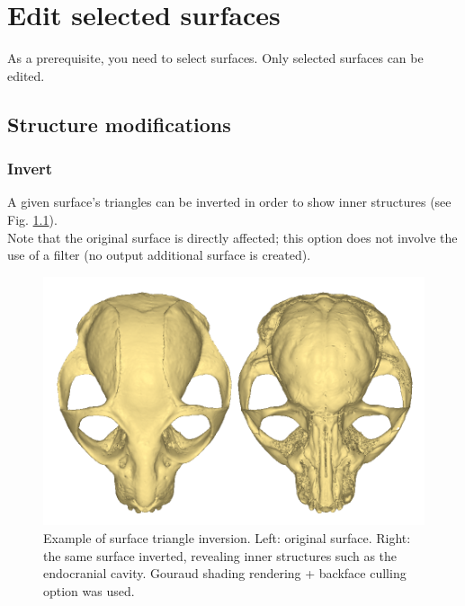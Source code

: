
\chapter{Edit selected surfaces}
\minitoc 


As a prerequisite, you need to select surfaces. Only selected surfaces can be edited. 



\section{Structure modifications}
\subsection{Invert}

A given surface's triangles can be
inverted in order to show inner structures (see Fig. \ref{inversion}).\\

Note that the original surface
is directly affected; this option
does not involve the use of a
filter (no output additional
surface is created).


\begin{figure}
  \centering
  \includegraphics[scale=0.4]{images/Edit_selected_objects/01_invert.png} 
	\caption{Example of surface triangle inversion. Left: original surface.
Right: the same surface inverted, revealing inner structures such
as the endocranial cavity. Gouraud shading rendering + backface
culling option was used.}
\label{inversion}
 
\end{figure}






